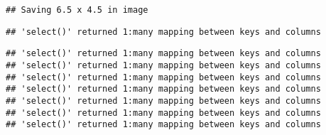 \documentclass[]{article}
\newenvironment{Shaded}{\begin{snugshade}}{\end{snugshade}}
\newcommand{\KeywordTok}[1]{\textcolor[rgb]{0.13,0.29,0.53}{\textbf{#1}}}
\newcommand{\DataTypeTok}[1]{\textcolor[rgb]{0.13,0.29,0.53}{#1}}
\newcommand{\StringTok}[1]{\textcolor[rgb]{0.31,0.60,0.02}{#1}}
\newcommand{\CommentTok}[1]{\textcolor[rgb]{0.56,0.35,0.01}{\textit{#1}}}
\newcommand{\OtherTok}[1]{\textcolor[rgb]{0.56,0.35,0.01}{#1}}
\newcommand{\ControlFlowTok}[1]{\textcolor[rgb]{0.13,0.29,0.53}{\textbf{#1}}}
\newcommand{\OperatorTok}[1]{\textcolor[rgb]{0.81,0.36,0.00}{\textbf{#1}}}
\newcommand{\NormalTok}[1]{#1}
\begin{document}
\begin{verbatim}
## Saving 6.5 x 4.5 in image
\end{verbatim}

\begin{Shaded}
\end{Shaded}

\begin{verbatim}
## 'select()' returned 1:many mapping between keys and columns
\end{verbatim}

\begin{verbatim}
## 'select()' returned 1:many mapping between keys and columns
## 'select()' returned 1:many mapping between keys and columns
## 'select()' returned 1:many mapping between keys and columns
## 'select()' returned 1:many mapping between keys and columns
## 'select()' returned 1:many mapping between keys and columns
## 'select()' returned 1:many mapping between keys and columns
## 'select()' returned 1:many mapping between keys and columns
\end{verbatim}
\end{document}
